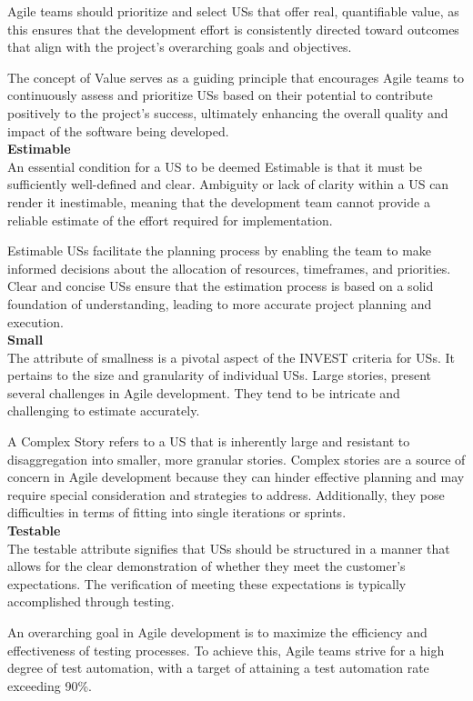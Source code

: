Agile teams should prioritize and select USs that offer real, quantifiable value, as this ensures that the development effort is consistently directed toward outcomes that align with the project's overarching goals and objectives.

The concept of Value serves as a guiding principle that encourages Agile teams to continuously assess and prioritize USs based on their potential to contribute positively to the project's success, ultimately enhancing the overall quality and impact of the software being developed.\\ 
\textbf{Estimable}\\ 
An essential condition for a US to be deemed Estimable is that it must be sufficiently well-defined and clear. Ambiguity or lack of clarity within a US can render it inestimable, meaning that the development team cannot provide a reliable estimate of the effort required for implementation.

Estimable USs facilitate the planning process by enabling the team to make informed decisions about the allocation of resources, timeframes, and priorities. Clear and concise USs ensure that the estimation process is based on a solid foundation of understanding, leading to more accurate project planning and execution. \\  
\textbf{Small}\\ 
The attribute of smallness is a pivotal aspect of the INVEST criteria for USs. It pertains to the size and granularity of individual USs. Large stories, present several challenges in Agile development. They tend to be intricate and challenging to estimate accurately. 

A Complex Story refers to a US that is inherently large and resistant to disaggregation into smaller, more granular stories. Complex stories are a source of concern in Agile development because they can hinder effective planning and may require special consideration and strategies to address. Additionally, they pose difficulties in terms of fitting into single iterations or sprints.\\ 
\textbf{Testable}\\ 
The testable attribute signifies that USs should be structured in a manner that allows for the clear demonstration of whether they meet the customer's expectations. The verification of meeting these expectations is typically accomplished through testing.

An overarching goal in Agile development is to maximize the efficiency and effectiveness of testing processes. To achieve this, Agile teams strive for a high degree of test automation, with a target of attaining a test automation rate exceeding 90\%.

